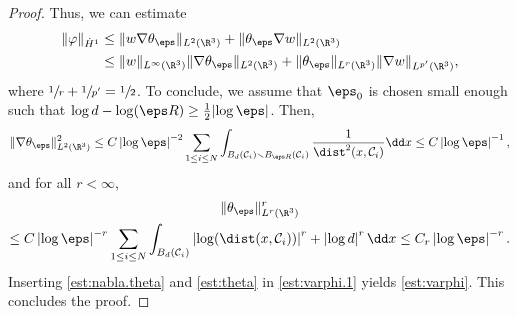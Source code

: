\begin{proof}
Thus, we can estimate
\begin{equation}
\begin{aligned} \label{est:varphi.1}
\| \varphi\|_{\dot H^1} &\leq \|w \nabla \theta_\eps\|_{L^2(\R^3)} + \|\theta_\eps \nabla w\|_{L^2(\R^3)} \\
&\leq \|w\|_{L^\infty(\R^3)} \| \nabla \theta_\eps\|_{L^2(\R^3)} + \|\theta_\eps\|_{L^r(\R^3)} \|\nabla w\|_{L^{p'}(\R^3)},
\end{aligned}
\end{equation}
where $\sfrac 1 r + \sfrac 1 {p'} = \sfrac 1 2$.
To conclude, we assume that $\eps_0$ is chosen small enough such that $\log d - \log (\eps R) \geq \frac 1 2 {\left|\log \eps\right|}$. Then,
\begin{equation} \label{est:nabla.theta}
\| \nabla \theta_\eps\|^2_{L^2(\R^3)} \leq C \left|\log \eps\right|^{-2} \sum_{1 \leq i \leq N} \int_{B_d(\mathcal C_i) \smallsetminus B_{\eps R}(\mathcal C_i)} \frac 1 {\dist^2(x,\mathcal C_i)} \dd x\leq C \left|\log \eps\right|^{-1},
\end{equation}
and for all $r < \infty$,
\begin{multline} \label{est:theta}
\|\theta_\eps\|^r_{L^r(\R^3)}\\
\leq C \left|\log \eps\right|^{-r} \sum_{1 \leq i \leq N} \int_{B_d(\mathcal C_i)} \left|\log(\dist(x,\mathcal C_i))\right|^r + \left|\log d\right|^r \dd x \leq C_r \left|\log \eps\right|^{-r}.
\end{multline}
Inserting \eqref{est:nabla.theta} and \eqref{est:theta} in \eqref{est:varphi.1} yields \eqref{est:varphi}.
This concludes the proof.
\end{proof}

